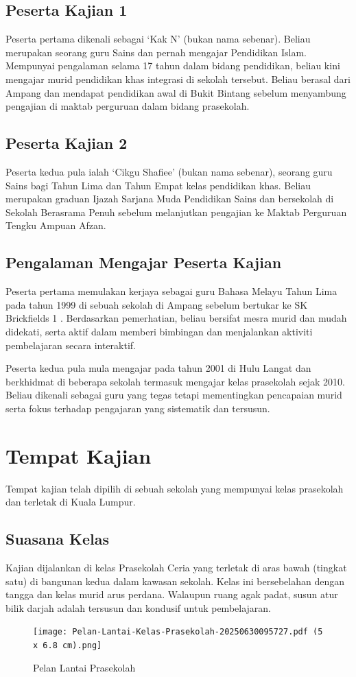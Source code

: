 {{\subsection{Peserta Kajian 1}
Peserta pertama dikenali sebagai ‘Kak N’ (bukan nama sebenar). Beliau merupakan seorang guru Sains dan pernah mengajar Pendidikan Islam. Mempunyai pengalaman selama 17 tahun dalam bidang pendidikan, beliau kini mengajar murid pendidikan khas integrasi di sekolah tersebut. Beliau berasal dari Ampang dan mendapat pendidikan awal di Bukit Bintang sebelum menyambung pengajian di maktab perguruan dalam bidang prasekolah.

\subsection{Peserta Kajian 2}
Peserta kedua pula ialah ‘Cikgu Shafiee’ (bukan nama sebenar), seorang guru Sains bagi Tahun Lima dan Tahun Empat kelas pendidikan khas. Beliau merupakan graduan Ijazah Sarjana Muda Pendidikan Sains dan bersekolah di Sekolah Berasrama Penuh sebelum melanjutkan pengajian ke Maktab Perguruan Tengku Ampuan Afzan.



\subsection{Pengalaman Mengajar Peserta Kajian}
Peserta pertama memulakan kerjaya sebagai guru Bahasa Melayu Tahun Lima pada tahun 1999 di sebuah sekolah di Ampang sebelum bertukar ke SK Brickfields 1 . Berdasarkan pemerhatian, beliau bersifat mesra murid dan mudah didekati, serta aktif dalam memberi bimbingan dan menjalankan aktiviti pembelajaran secara interaktif.

Peserta kedua pula mula mengajar pada tahun 2001 di Hulu Langat dan berkhidmat di beberapa sekolah termasuk mengajar kelas prasekolah sejak 2010. Beliau dikenali sebagai guru yang tegas tetapi mementingkan pencapaian murid serta fokus terhadap pengajaran yang sistematik dan tersusun.
\section{Tempat Kajian}
Tempat kajian telah dipilih di sebuah sekolah yang mempunyai kelas prasekolah dan terletak di Kuala Lumpur.

\subsection{Suasana Kelas}
Kajian dijalankan di kelas Prasekolah Ceria yang terletak di aras bawah (tingkat satu) di bangunan kedua dalam kawasan sekolah. Kelas ini bersebelahan dengan tangga dan kelas murid arus perdana. Walaupun ruang agak padat, susun atur bilik darjah adalah tersusun dan kondusif untuk pembelajaran.
\begin{figure}
    \centering
    \texttt{[image: Pelan-Lantai-Kelas-Prasekolah-20250630095727.pdf (5 x 6.8 cm).png]}
    \caption{Pelan Lantai Prasekolah}
    \label{fig:enter-label}
\end{figure}


}}
